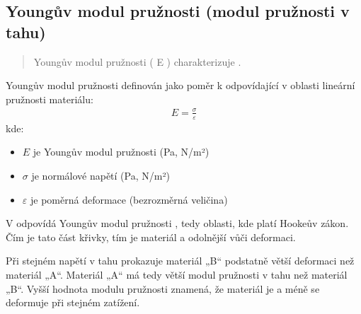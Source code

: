 \documentclass[letterpaper,10pt,english]{jupyterBook}
\begin{document}
\subsection{Youngův modul pružnosti (modul pružnosti v tahu)}
\label{\detokenize{Prednasky/2_2_Hooke_u016fv_z_xe1kon:younguv-modul-pruznosti-modul-pruznosti-v-tahu}}\begin{quote}

\sphinxAtStartPar
Youngův modul pružnosti ( E ) charakterizuje .
\end{quote}

\sphinxAtStartPar
Youngův modul pružnosti definován jako poměr  k odpovídající  v oblasti lineární pružnosti materiálu:
\begin{equation*}
\begin{split}
E = \frac{\sigma}{\varepsilon}
\end{split}
\end{equation*}
\sphinxAtStartPar
kde:
\begin{itemize}
\item {} 
\sphinxAtStartPar
\(E\) je Youngův modul pružnosti (Pa, N/m²)

\item {} 
\sphinxAtStartPar
\(\sigma\) je normálové napětí (Pa, N/m²)

\item {} 
\sphinxAtStartPar
\(\varepsilon\) je poměrná deformace (bezrozměrná veličina)

\end{itemize}

\sphinxAtStartPar
V  odpovídá Youngův modul pružnosti , tedy oblasti, kde platí Hookeův zákon. Čím  je tato část křivky, tím je materiál  a odolnější vůči deformaci.

\noindent{}

\sphinxAtStartPar
Při stejném napětí v tahu prokazuje materiál „B“ podstatně větší deformaci než materiál „A“. Materiál „A“ má tedy větší modul pružnosti v tahu než materiál „B“. Vyšší hodnota modulu pružnosti znamená, že materiál je  a méně se deformuje při stejném zatížení.
\end{document}
